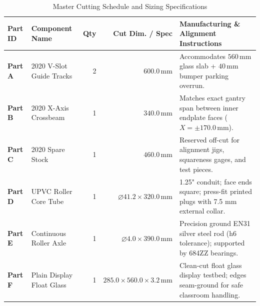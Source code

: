 \documentclass[10pt,a4paper]{article}
\begin{document}
\begin{table}[H]
\centering
\small
\begin{tabularx}{\textwidth}{l l r r X}
\toprule
\textbf{Part ID} & \textbf{Component Name} & \textbf{Qty} & \textbf{Cut Dim. / Spec} & \textbf{Manufacturing \& Alignment Instructions} \\
\midrule
\textbf{Part A} & 2020 V-Slot Guide Tracks & 2 & $600.0\,\text{mm}$ & Accommodates $560\,\text{mm}$ glass slab + $40\,\text{mm}$ bumper parking overrun. \\
\textbf{Part B} & 2020 X-Axis Crossbeam & 1 & $340.0\,\text{mm}$ & Matches exact gantry span between inner endplate faces ($X = \pm 170.0\,\text{mm}$). \\
\textbf{Part C} & 2020 Spare Stock & 1 & $460.0\,\text{mm}$ & Reserved off-cut for alignment jigs, squareness gages, and test pieces. \\
\textbf{Part D} & UPVC Roller Core Tube & 1 & $\varnothing 41.2 \times 320.0\,\text{mm}$ & 1.25" conduit; face ends square; press-fit printed plugs with 7.5 mm external collar. \\
\textbf{Part E} & Continuous Roller Axle & 1 & $\varnothing 4.0 \times 390.0\,\text{mm}$ & Precision ground EN31 silver steel rod (h6 tolerance); supported by 684ZZ bearings. \\
\textbf{Part F} & Plain Display Float Glass & 1 & $285.0 \times 560.0 \times 3.2\,\text{mm}$ & Clean-cut float glass display testbed; edges seam-ground for safe classroom handling. \\
\bottomrule
\end{tabularx}
\caption{Master Cutting Schedule and Sizing Specifications}
\label{tab:cut_list}
\end{table}
\end{document}
